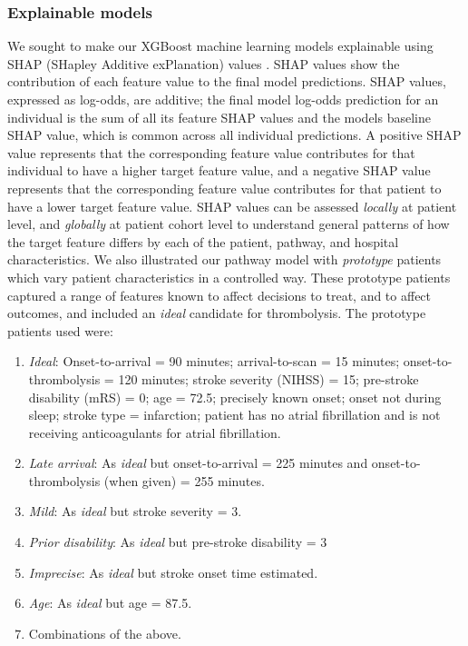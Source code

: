 
\subsubsection{Explainable models}

We sought to make our XGBoost machine learning models explainable using SHAP (SHapley Additive exPlanation) values \cite{lundberg_unified_2017}. SHAP values show the contribution of each feature value to the final model predictions. SHAP values, expressed as log-odds, are additive; the final model log-odds prediction for an individual is the sum of all its feature SHAP values and the models baseline SHAP value, which is common across all individual predictions. A positive SHAP value represents that the corresponding feature value contributes for that individual to have a higher target feature value, and a negative SHAP value represents that the corresponding feature value contributes for that patient to have a lower target feature value. SHAP values can be assessed \textit{locally} at patient level, and \textit{globally} at patient cohort level to understand general patterns of how the target feature differs by each of the patient, pathway, and hospital characteristics. We also illustrated our pathway model with \textit{prototype} patients which vary patient characteristics in a controlled way. These prototype patients captured a range of features known to affect decisions to treat, and to affect outcomes, and included an \textit{ideal} candidate for thrombolysis. The prototype patients used were:

\begin{enumerate}
    \item \textit{Ideal}: Onset-to-arrival = 90 minutes; arrival-to-scan = 15 minutes; onset-to-thrombolysis = 120 minutes; stroke severity (NIHSS) = 15; pre-stroke disability (mRS) = 0; age = 72.5; precisely known onset; onset not during sleep; stroke type = infarction; patient has no atrial fibrillation and is not receiving anticoagulants for atrial fibrillation.

    \item \textit{Late arrival}: As \textit{ideal} but onset-to-arrival = 225 minutes and onset-to-thrombolysis (when given) = 255 minutes.

    \item \textit{Mild}: As \textit{ideal} but stroke severity = 3.

    \item \textit{Prior disability}: As \textit{ideal} but pre-stroke disability = 3

    \item \textit{Imprecise}: As \textit{ideal} but stroke onset time estimated.

    \item \textit{Age}: As \textit{ideal} but age = 87.5.

    \item Combinations of the above.
\end{enumerate}


